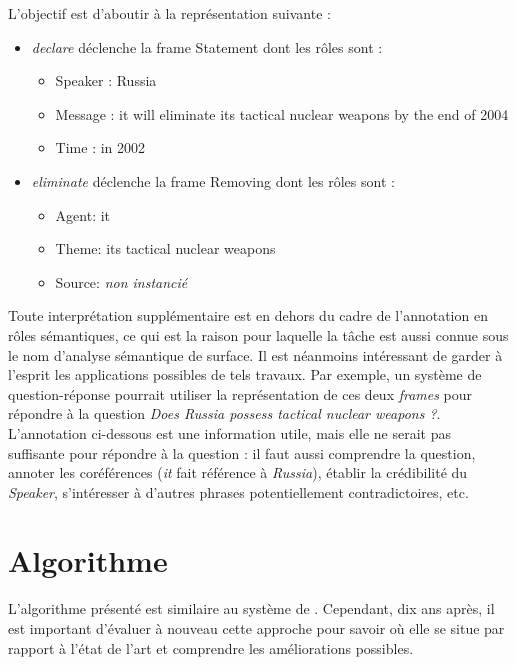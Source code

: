 L'objectif est d'aboutir à la représentation suivante :

\begin{itemize}
    \item \emph{declare} déclenche la frame Statement dont les rôles sont :
    \begin{itemize}
        \item Speaker : Russia
        \item Message : it will eliminate its tactical nuclear weapons by the end of 2004
        \item Time : in 2002
    \end{itemize}
    \item \emph{eliminate} déclenche la frame Removing dont les rôles sont :
    \begin{itemize}
        \item Agent: it
        \item Theme: its tactical nuclear weapons
        \item Source: \emph{non instancié}
    \end{itemize}
\end{itemize}

Toute interprétation supplémentaire est en dehors du cadre de l'annotation en
rôles sémantiques, ce qui est la raison pour laquelle la tâche est aussi connue
sous le nom d'analyse sémantique de surface. Il est néanmoins intéressant de
garder à l'esprit les applications possibles de tels travaux. Par exemple, un
système de question-réponse pourrait utiliser la représentation de ces deux
\emph{frames} pour répondre à la question \emph{Does Russia possess tactical
nuclear weapons ?}. L'annotation ci-dessous est une information utile, mais
elle ne serait pas suffisante pour répondre à la question : il faut aussi
comprendre la question, annoter les coréférences (\emph{it} fait référence à
\emph{Russia}), établir la crédibilité du \emph{Speaker}, s'intéresser à
d'autres phrases potentiellement contradictoires, etc.

\section{Algorithme}

L'algorithme présenté est similaire au système de
\cite{swier2004unsupervised,swier2005exploiting}. Cependant, dix ans après, il
est important d'évaluer à nouveau cette approche pour savoir où elle se situe
par rapport à l'état de l'art et comprendre les améliorations possibles.

